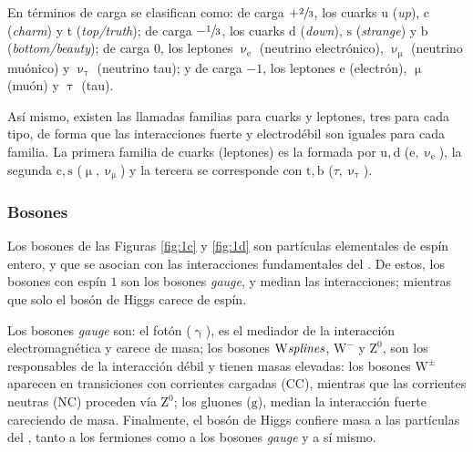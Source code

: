 En términos de carga \color{vero} se clasifican \color{norm} como:  de carga $+\sfrac{2}{3}$, los cuarks u (\emph{up}), c  (\emph{charm}) y t (\emph{top/truth}); de carga $-\sfrac{1}{3}$, los cuarks $\mathrm{d}$ (\emph{down}), $\mathrm{s}$ (\emph{strange}) y $\mathrm{b}$ (\emph{bottom/beauty}); de carga $0$, los leptones $\upnu_{\text{e}}$ (neutrino electrónico), $\upnu_{\upmu}$ (neutrino muónico) y $\upnu_{\uptau}$ (neutrino tau); y de carga $-1$, los leptones $\text{e}$ (electrón), $\upmu$ (muón) y $\uptau$ (tau).

Así mismo, existen las llamadas familias para cuarks y leptones, tres para cada tipo, de forma que las interacciones fuerte y electrodébil son iguales para cada familia. La primera familia de cuarks (leptones) es la formada por $\mathrm{u,d}$ ($\text{e},\upnu_{\text{e}}$), la segunda $\mathrm{c,s}$ ($\upmu,\upnu_{\upmu}$) y la tercera se corresponde con $\mathrm{t,b}$ ($\tau,\upnu_{\uptau}$).



\subsubsection{Bosones} %

\color{dieg}
Los bosones de las \color{vero} Figuras \ref{fig:1c} y \ref{fig:1d} \color{norm} son partículas elementales de espín entero, y que se asocian con las interacciones fundamentales del \stdmod. De estos, los bosones con espín \color{vero} $1$ \color{norm} son los bosones \emph{gauge}, y median las interacciones; mientras que solo el bosón de Higgs carece de espín. \color{norm}
  
Los bosones \emph{gauge} son: el fotón ($\upgamma$), es el mediador de la interacción electromagnética y carece de masa; los bosones $\mathrm{W\emph{splines}}$, $\mathrm{W^-}$ y $\mathrm{Z^0}$, son los responsables de la interacción débil y tienen masas elevadas: los bosones $\mathrm{W^{\pm}}$ aparecen en transiciones con corrientes cargadas (CC), mientras que las corrientes neutras (NC) proceden vía $\mathrm{Z^0}$; los gluones ($\mathrm{g}$), median la interacción fuerte careciendo de masa.
%
\color{dieg}
Finalmente, el bosón de Higgs \color{vero} confiere  masa a las partículas del \stdmod, tanto a los fermiones como a los bosones \emph{gauge} y a sí mismo. \color{norm}



